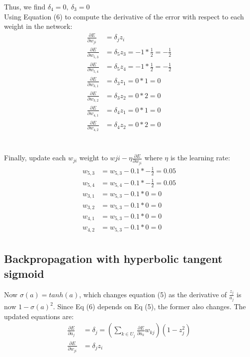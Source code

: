\documentclass{article}
\begin{document}
Thus, we find $\delta_4 = 0,~\delta_3 = 0$
\\
Using Equation (6) to compute the derivative of the error with respect to each weight in the network: \\
\begin{align*}
\frac{\partial E}{\partial w_{ji}} &= \delta_j z_i \tag{6} \\
\frac{\partial E}{\partial w_{5,3}} &= \delta_5 z_3 = -1*\frac{1}{2} = -\frac{1}{2} \\
\frac{\partial E}{\partial w_{5,4}} &= \delta_5 z_4 = -1*\frac{1}{2} = -\frac{1}{2} \\
\frac{\partial E}{\partial w_{3,1}} &= \delta_3 z_1 = 0*1 = 0 \\
\frac{\partial E}{\partial w_{3,2}} &= \delta_3 z_2 = 0*2 = 0 \\
\frac{\partial E}{\partial w_{4,1}} &= \delta_4 z_1 = 0*1 = 0 \\
\frac{\partial E}{\partial w_{4,2}} &= \delta_4 z_2 = 0*2 = 0
\end{align*}
\\
\\
Finally, update each $w_{ji}$ weight to $w{ji} - \eta \frac{\partial E}{\partial w_{ji}}$ where $\eta$ is the learning rate:
\begin{align*}
 w_{5,3} &= w_{5,3} - 0.1*-\frac{1}{2} = 0.05\\
 w_{5,4} &= w_{5,4} - 0.1*-\frac{1}{2} = 0.05\\
 w_{3,1} &= w_{5,3} - 0.1*0 = 0\\
 w_{3,2} &= w_{5,3} - 0.1*0 = 0\\
 w_{4,1} &= w_{5,3} - 0.1*0 = 0\\
 w_{4,2} &= w_{5,3} - 0.1*0 = 0\\
\end{align*}


\subsection*{Backpropagation with hyperbolic tangent sigmoid}
Now $\sigma(a) = tanh(a)$, which changes equation (5) as the derivative of $\frac{z_j}{a_j}$ is now $1 - \sigma(a)^2$. Since Eq (6) depends on Eq (5), the former also changes. 
The updated equations are:
\begin{align*}
\frac{\partial E}{\partial a_j} &= \delta_j = \left( \sum_{k \in U_j} \frac{\partial E}{\partial a_k} w_{kj}  \right) \left( 1 - z_j^2 \right) \tag{5}\\
\frac{\partial E}{\partial w_{ji}} &= \delta_j z_i \tag{6}
\end{align*}
\end{document}
